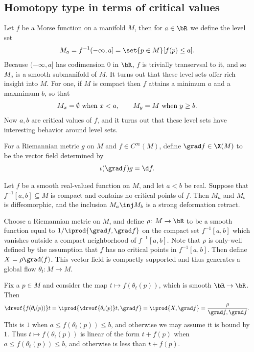 \subsection{Homotopy type in terms of critical values}

Let $f$ be a Morse function on a manifold $M$, then for $a\in\bR$ we define the {\emphcolor level set}
$$ M_a = f^{-1}(-\infty,a] = \set{p\in M}[f(p)\leq a] . $$
Because $(-\infty,a]$ has codimension $0$ in $\bR$, $f$ is trivially transervsal to it, and so $M_a$
is a smooth submanifold of $M$.
It turns out that these level sets offer rich insight into $M$.
For one, if $M$ is compact then $f$ attains a minimum $a$ and a maxmimum $b$, so that
$$ M_x = \emptyset\hbox{ when $x<a$},\qquad M_y = M\hbox{ when $y\geq b$} . $$
Now $a,b$ are critical values of $f$, and it turns out that these level sets have interesting behavior
around level sets.

For a Riemannian metric $g$ on $M$ and $f\in C^\infty(M)$, define $\grad f\in\X(M)$ to be the vector field
determined by
$$ \iota(\grad f)g = \d f . $$

\bthrm[name={nocritdiff}]

    Let $f$ be a smooth real-valued function on $M$, and let $a<b$ be real.
    Suppose that $f^{-1}[a,b]\subseteq M$ is compact and contains no critical points of $f$.
    Then $M_a$ and $M_b$ is diffeomorphic, and the inclusion $M_a\inj M_b$ is a strong deformation retract.

\ethrm

\bproof

    Choose a Riemannian metric on $M$, and define $\rho\colon M\to\bR$ to be a smooth function equal to
    $1/\iprod{\grad f,\grad f}$ on the compact set $f^{-1}[a,b]$ which vanishes outside a compact
    neighborhood of $f^{-1}[a,b]$.
    Note that $\rho$ is only-well defined by the assumption that $f$ has no critical points in $f^{-1}[a,b]$.
    Then define $X=\rho\grad(f)$.
    This vector field is compactly supported and thus generates a global flow $\theta_t\colon M\to M$.

    Fix a $p\in M$ and consider the map $t\mapsto f(\theta_t(p))$, which is smooth $\bR\to\bR$.
    Then
    $$ \drvof{f(\theta_t(p))}t = \iprod{\drvof{\theta_t(p)}t,\grad f} = \iprod{X,\grad f} =
    \frac\rho{\grad f,\grad f} . $$
    This is $1$ when $a\leq f(\theta_t(p))\leq b$, and otherwise we may assume it is bound by $1$.
    Thus $t\mapsto f(\theta_t(p))$ is linear of the form $t+f(p)$ when $a\leq f(\theta_t(p))\leq b$, and
    otherwise is less than $t+f(p)$.

